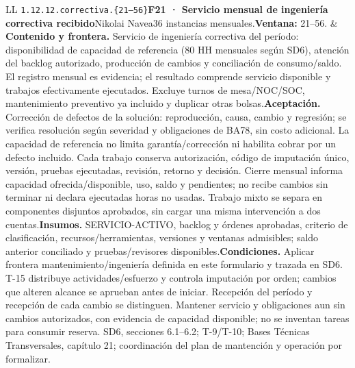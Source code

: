 \begin{longtable}{L{\tabcolsep\relax}L{\tabcolsep\relax}}
\texttt{1.\allowbreak{}12.\allowbreak{}12.\allowbreak{}correctiva.\allowbreak{}\{21--56\}}\newline{}\textbf{F21 · Servicio mensual de ingeniería correctiva recibido}\newline{}Nikolai Navea\newline{}36 instancias mensuales.\newline{}\textbf{Ventana:} 21--56. & \textbf{Contenido y frontera.} Servicio de ingeniería correctiva del período: disponibilidad de capacidad de referencia (80 HH mensuales según SD6), atención del backlog autorizado, producción de cambios y conciliación de consumo/saldo. El registro mensual es evidencia; el resultado comprende servicio disponible y trabajos efectivamente ejecutados. Excluye turnos de mesa/NOC/SOC, mantenimiento preventivo ya incluido y duplicar otras bolsas.\newline{}\textbf{Aceptación.} Corrección de defectos de la solución: reproducción, causa, cambio y regresión; se verifica resolución según severidad y obligaciones de BA78, sin costo adicional. La capacidad de referencia no limita garantía/corrección ni habilita cobrar por un defecto incluido. Cada trabajo conserva autorización, código de imputación único, versión, pruebas ejecutadas, revisión, retorno y decisión. Cierre mensual informa capacidad ofrecida/disponible, uso, saldo y pendientes; no recibe cambios sin terminar ni declara ejecutadas horas no usadas. Trabajo mixto se separa en componentes disjuntos aprobados, sin cargar una misma intervención a dos cuentas.\newline{}\textbf{Insumos.} SERVICIO-ACTIVO, backlog y órdenes aprobadas, criterio de clasificación, recursos/herramientas, versiones y ventanas admisibles; saldo anterior conciliado y pruebas/revisores disponibles.\newline{}\textbf{Condiciones.} Aplicar frontera mantenimiento/ingeniería definida en este formulario y trazada en SD6. T-15 distribuye actividades/esfuerzo y controla imputación por orden; cambios que alteren alcance se aprueban antes de iniciar. Recepción del período y recepción de cada cambio se distinguen. Mantener servicio y obligaciones aun sin cambios autorizados, con evidencia de capacidad disponible; no se inventan tareas para consumir reserva. SD6, secciones 6.1--6.2; T-9/T-10; Bases Técnicas Transversales, capítulo 21; coordinación del plan de mantención y operación por formalizar.\\\hline

\end{longtable}
